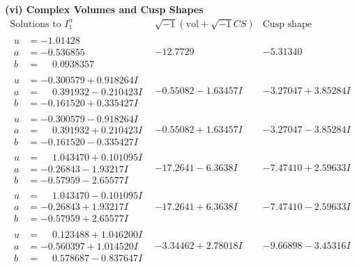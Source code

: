 \documentclass[1p]{elsarticle_modified}
\theoremstyle{definition}
\newcommand{\I}{\sqrt{-1}}
\begin{document}
\newpage\flushleft \textbf{(vi) Complex Volumes and Cusp Shapes}
$$\begin{array}{c|c|c}  
\text{Solutions to }I^u_{1}& \I (\text{vol} + \sqrt{-1}CS) & \text{Cusp shape}\\
 \hline 
\begin{aligned}
u &= -1.01428\phantom{ +0.000000I} \\
a &= -0.536855\phantom{ +0.000000I} \\
b &= \phantom{-}0.0938357\phantom{ +0.000000I}\end{aligned}
 & -12.7729\phantom{ +0.000000I} & -5.31340\phantom{ +0.000000I} \\ \hline\begin{aligned}
u &= -0.300579 + 0.918264 I \\
a &= \phantom{-}0.391932 - 0.210423 I \\
b &= -0.161520 + 0.335427 I\end{aligned}
 & -0.55082 - 1.63457 I & -3.27047 + 3.85284 I \\ \hline\begin{aligned}
u &= -0.300579 - 0.918264 I \\
a &= \phantom{-}0.391932 + 0.210423 I \\
b &= -0.161520 - 0.335427 I\end{aligned}
 & -0.55082 + 1.63457 I & -3.27047 - 3.85284 I \\ \hline\begin{aligned}
u &= \phantom{-}1.043470 + 0.101095 I \\
a &= -0.26843 - 1.93217 I \\
b &= -0.57959 - 2.65577 I\end{aligned}
 & -17.2641 - 6.3638 I & -7.47410 + 2.59633 I \\ \hline\begin{aligned}
u &= \phantom{-}1.043470 - 0.101095 I \\
a &= -0.26843 + 1.93217 I \\
b &= -0.57959 + 2.65577 I\end{aligned}
 & -17.2641 + 6.3638 I & -7.47410 - 2.59633 I \\ \hline\begin{aligned}
u &= \phantom{-}0.123488 + 1.046200 I \\
a &= -0.560397 + 1.014520 I \\
b &= \phantom{-}0.578687 - 0.837647 I\end{aligned}
 & -3.34462 + 2.78018 I & -9.66898 - 3.45316 I \\ \hline\begin{aligned}

\end{aligned}
\end{array}$$
\end{document}

